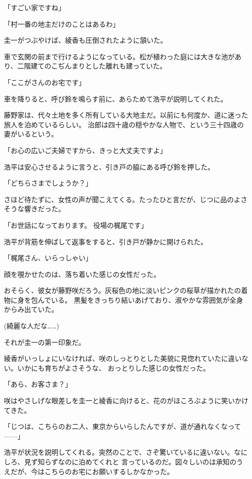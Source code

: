 ﻿\documentclass[
    book,tate,
    line_length=30zw,
    jafontsize=12pt,
    paper=b5j,
    landscape,
    ]{jlreq}
\begin{document}
「すごい家ですね」

「村一番の地主だけのことはあるわ」

圭一がつぶやけば、綾香も圧倒されたように頷いた。

車で玄関の前まで行けるようになっている。松が植わった庭には大きな池があり、二階建てのこぢんまりとした離れも建っていた。

「ここがさんのお宅です」

車を降りると、呼び鈴を鳴らす前に、あらためて浩平が説明してくれた。

藤野家は、代々土地を多く所有している大地主だ。以前にも何度か、道に迷った旅人を泊めているらしい。
治郎は四十歳の穏やかな人物で、という三十四歳の妻がいるという。

「お心の広いご夫婦ですから、きっと大丈夫ですよ」

浩平は安心させるように言うと、引き戸の脇にある呼び鈴を押した。

「どちらさまでしょうか？」

さほど待たずに、女性の声が聞こえてくる。たったひと言だが、じつに品のよさそうな響きだった。

「お世話になっております。 役場の梶尾です」

浩平が背筋を伸ばして返事をすると、引き戸が静かに開けられた。

「梶尾さん、いらっしゃい」

顔を覗かせたのは、落ち着いた感じの女性だった。

おそらく、彼女が藤野咲だろう。灰桜色の地に淡いピンクの桜草が描かれたの着物に身を包んでいる。
黒髪をきっちり結いあげており、淑やかな雰囲気が全身からみ出ていた。

(綺麗な人だな……)

それが圭一の第一印象だ。

綾香がいっしょにいなければ、咲のしっとりとした美貌に見惚れていたに違いない。いかにも育ちがよさそうな、
おっとりした感じの女性だった。

「あら、お客さま？」

咲はやさしげな眼差しを圭一と綾香に向けると、花のがほころぶように笑いかけてきた。

「じつは、こちらのお二人、東京からいらしたんですが、道が通れなくなって------」

浩平が状況を説明してくれる。突然のことで、さぞ驚いているに違いない。なにしろ、見ず知らずなのに泊めてくれと
言っているのだ。図々しいのは承知のうえだが、今はこちらのお宅にお願いするしかなかった。
\end{document}
